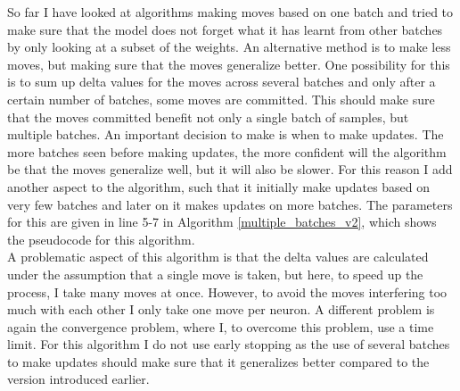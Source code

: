 \noindent So far I have looked at algorithms making moves based on one batch and tried to make sure that the model does not forget what it has learnt from other batches by only looking at a subset of the weights. An alternative method is to make less moves, but making sure that the moves generalize better. One possibility for this is to sum up delta values for the moves across several batches and only after a certain number of batches, some moves are committed. This should make sure that the moves committed benefit not only a single batch of samples, but multiple batches. An important decision to make is when to make updates. The more batches seen before making updates, the more confident will the algorithm be that the moves generalize well, but it will also be slower. For this reason I add another aspect to the algorithm, such that it initially make updates based on very few batches and later on it makes updates on more batches. The parameters for this are given in line 5-7 in Algorithm \ref{multiple_batches_v2}, which shows the pseudocode for this algorithm. \\

A problematic aspect of this algorithm is that the delta values are calculated under the assumption that a single move is taken, but here, to speed up the process, I take many moves at once. However, to avoid the moves interfering too much with each other I only take one move per neuron. A different problem is again the convergence problem, where I, to overcome this problem, use a time limit. For this algorithm I do not use early stopping as the use of several batches to make updates should make sure that it generalizes better compared to the version introduced earlier. 


